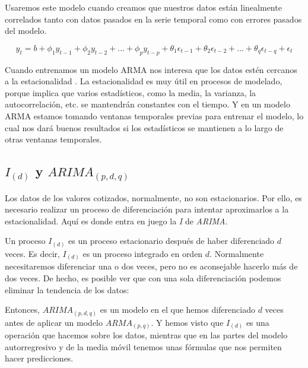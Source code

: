 Usaremos este modelo cuando creamos que nuestros datos están linealmente correlados tanto con datos pasados en la serie temporal como con errores pasados del modelo. 

\begin{equation}
	y_{t} = b + \phi_{1}y_{t-1} + \phi_{2}y_{t-2} + ... + \phi_{p}y_{t-p} + \theta_{1}\epsilon_{t-1} + \theta_{2}\epsilon_{t-2} + ... + \theta_{q}\epsilon_{t-q} + \epsilon_{t}
\end{equation}

Cuando entrenamos un modelo ARMA nos interesa que los datos estén cercanos a la estacionalidad \citep{wiki:estacionalidad}. La estacionalidad es muy útil en procesos de modelado, porque implica que varios estadísticos, como la media, la varianza, la autocorrelación, etc. se mantendrán constantes con el tiempo. Y en un modelo ARMA estamos tomando ventanas temporales previas para entrenar el modelo, lo cual nos dará buenos resultados si los estadísticos se mantienen a lo largo de otras ventanas temporales. 


\subsection{$I_{(d)}$ y $ARIMA_{(p, d, q)}$}

Los datos de los valores cotizados, normalmente, no son estacionarios. Por ello, es necesario realizar un proceso de diferenciación para intentar aproximarlos a la estacionalidad. Aquí es donde entra en juego la \emph{I} de \emph{ARIMA}. 

Un proceso $I_{(d)}$ es un proceso estacionario después de haber diferenciado $d$ veces. Es decir, $I_{(d)}$ es un proceso integrado en orden $d$. Normalmente necesitaremos diferenciar una o dos veces, pero no es aconsejable hacerlo más de dos veces. De hecho, es posible ver que con una sola diferenciación podemos eliminar la tendencia de los datos:



Entonces, $ARIMA_{(p, d, q)}$ es un modelo en el que hemos diferenciado $d$ veces antes de aplicar un modelo $ARMA_{(p, q)}$. Y hemos visto que $I_{(d)}$ es una operación que hacemos sobre los datos, mientras que en las partes del modelo autorregresivo y de la media móvil tenemos unas fórmulas que nos permiten hacer predicciones. 


